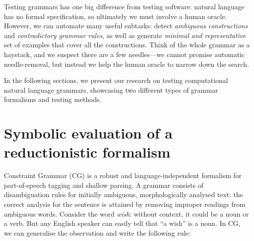 


Testing grammars has one big difference from testing software: natural language has no formal specification, 
so ultimately we must involve a human oracle. However, we can automate many useful subtasks: detect \emph{ambiguous constructions} and \emph{contradictory grammar rules}, as well as generate \emph{minimal and representative} set of examples that cover all the constructions. 
Think of the whole grammar as a haystack, and we suspect there are a few needles---we cannot promise automatic needle-removal, but instead we help the human oracle to narrow down the search.

In the following sections, we present our research on testing computational natural language grammars, showcasing two different types of grammar formalisms and testing methods.

\section{Symbolic evaluation of a reductionistic formalism}

Constraint Grammar (CG) \cite{karlsson1995constraint} is a robust and language-independent formalism 
for part-of-speech tagging and shallow parsing. 
A grammar consists of disambiguation rules for initially ambiguous, 
morphologically analysed text: the correct analysis for the sentence 
is attained by removing improper readings from ambiguous words.
Consider the word \emph{wish}: without context, it could be a noun or a verb.
But any English speaker can easily tell that ``a wish'' is a noun.
In CG, we can generalise the observation and write the following rule:

